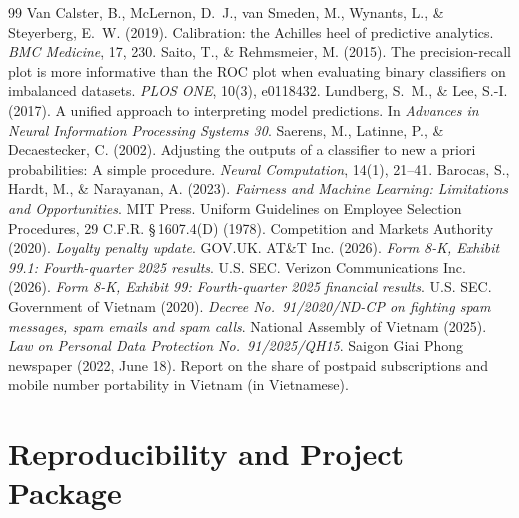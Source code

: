 \documentclass[11pt,a4paper]{article}
\begin{document}
\begin{thebibliography}{99}
 Van Calster, B., McLernon, D.~J., van Smeden, M., Wynants, L., \& Steyerberg, E.~W. (2019). Calibration: the Achilles heel of predictive analytics. \emph{BMC Medicine}, 17, 230.
 Saito, T., \& Rehmsmeier, M. (2015). The precision-recall plot is more informative than the ROC plot when evaluating binary classifiers on imbalanced datasets. \emph{PLOS ONE}, 10(3), e0118432.
 Lundberg, S.~M., \& Lee, S.-I. (2017). A unified approach to interpreting model predictions. In \emph{Advances in Neural Information Processing Systems 30}.
 Saerens, M., Latinne, P., \& Decaestecker, C. (2002). Adjusting the outputs of a classifier to new a priori probabilities: A simple procedure. \emph{Neural Computation}, 14(1), 21--41.
 Barocas, S., Hardt, M., \& Narayanan, A. (2023). \emph{Fairness and Machine Learning: Limitations and Opportunities}. MIT Press.
 Uniform Guidelines on Employee Selection Procedures, 29 C.F.R. \S\,1607.4(D) (1978).
 Competition and Markets Authority (2020). \emph{Loyalty penalty update}. GOV.UK.
 AT\&T Inc. (2026). \emph{Form 8-K, Exhibit 99.1: Fourth-quarter 2025 results}. U.S. SEC.
 Verizon Communications Inc. (2026). \emph{Form 8-K, Exhibit 99: Fourth-quarter 2025 financial results}. U.S. SEC.
 Government of Vietnam (2020). \emph{Decree No.\ 91/2020/ND-CP on fighting spam messages, spam emails and spam calls}.
 National Assembly of Vietnam (2025). \emph{Law on Personal Data Protection No.\ 91/2025/QH15}.
 Saigon Giai Phong newspaper (2022, June 18). Report on the share of postpaid subscriptions and mobile number portability in Vietnam (in Vietnamese).
\end{thebibliography}

\appendix
\section{Reproducibility and Project Package}
\end{document}
